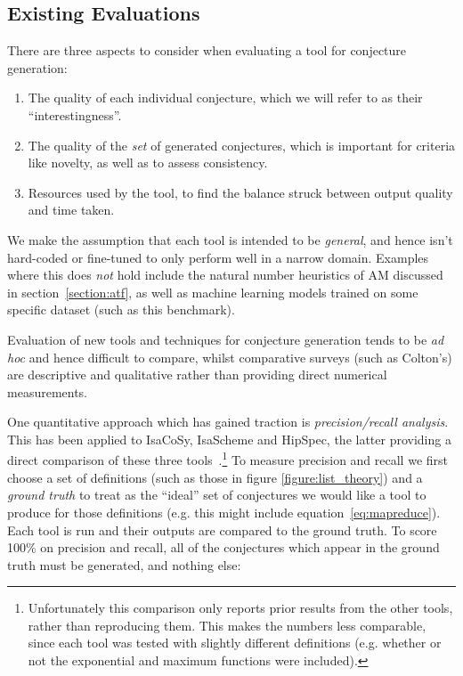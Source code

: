 \subsection{Existing Evaluations}
\label{sec:existing}

There are three aspects to consider when evaluating a tool for conjecture
generation:

\begin{enumerate}
\item The quality of each individual conjecture, which we will refer to as their
  ``interestingness''.
\item The quality of the \emph{set} of generated conjectures, which is important
  for criteria like novelty, as well as to assess consistency.
\item Resources used by the tool, to find the balance struck between output
  quality and time taken.
\end{enumerate}

We make the assumption that each tool is intended to be \emph{general}, and
hence isn't hard-coded or fine-tuned to only perform well in a narrow domain.
Examples where this does \emph{not} hold include the natural number heuristics
of AM discussed in section~\ref{section:atf}, as well as machine learning models
trained on some specific dataset (such as this benchmark).

Evaluation of new tools and techniques for conjecture generation tends to be
\emph{ad hoc} and hence difficult to compare, whilst comparative surveys (such
as Colton's) are descriptive and qualitative rather than providing direct
numerical measurements.

One quantitative approach which has gained traction is \emph{precision/recall
  analysis}. This has been applied to IsaCoSy, IsaScheme and HipSpec, the latter
providing a direct comparison of these three
tools~\cite{claessen2013automating}.\footnote{Unfortunately this comparison only
  reports prior results from the other tools, rather than reproducing them.
  This makes the numbers less comparable, since each tool was tested with
  slightly different definitions (e.g. whether or not the exponential and
  maximum functions were included).} To measure precision and recall we first
choose a set of definitions (such as those in figure \ref{figure:list_theory})
and a \emph{ground truth} to treat as the ``ideal'' set of conjectures we would
like a tool to produce for those definitions (e.g. this might include
equation~\ref{eq:mapreduce}). Each tool is run and their outputs are compared to
the ground truth. To score 100\% on precision and recall, all of the conjectures
which appear in the ground truth must be generated, and nothing else:

